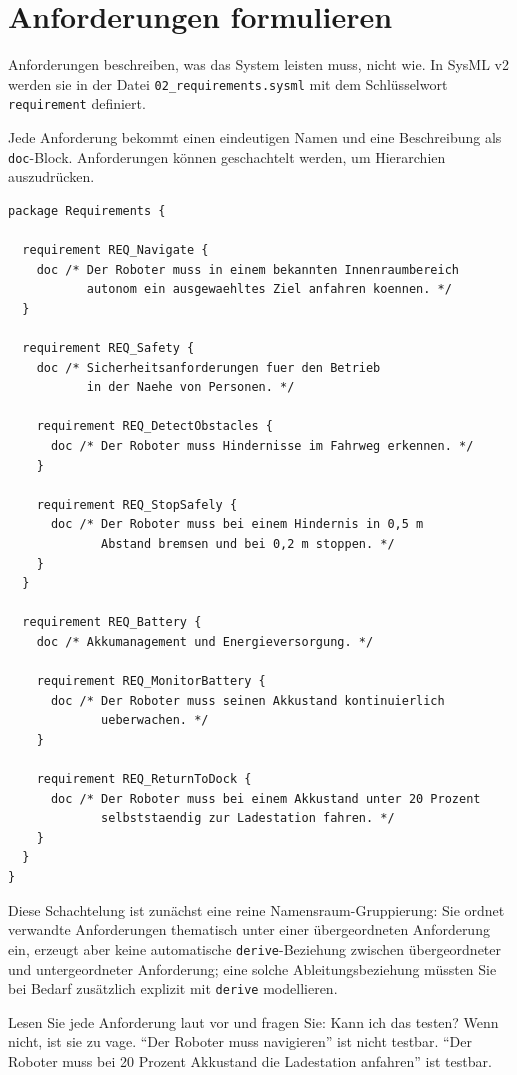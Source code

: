 \section{Anforderungen formulieren}

Anforderungen beschreiben, was das System leisten muss, nicht wie. In SysML v2 werden sie in der Datei \texttt{02\_requirements.sysml} mit dem Schlüsselwort \texttt{requirement} definiert.

Jede Anforderung bekommt einen eindeutigen Namen und eine Beschreibung als \texttt{doc}-Block. Anforderungen können geschachtelt werden, um Hierarchien auszudrücken.

\begin{lstlisting}
package Requirements {

  requirement REQ_Navigate {
    doc /* Der Roboter muss in einem bekannten Innenraumbereich
           autonom ein ausgewaehltes Ziel anfahren koennen. */
  }

  requirement REQ_Safety {
    doc /* Sicherheitsanforderungen fuer den Betrieb
           in der Naehe von Personen. */

    requirement REQ_DetectObstacles {
      doc /* Der Roboter muss Hindernisse im Fahrweg erkennen. */
    }

    requirement REQ_StopSafely {
      doc /* Der Roboter muss bei einem Hindernis in 0,5 m
             Abstand bremsen und bei 0,2 m stoppen. */
    }
  }

  requirement REQ_Battery {
    doc /* Akkumanagement und Energieversorgung. */

    requirement REQ_MonitorBattery {
      doc /* Der Roboter muss seinen Akkustand kontinuierlich
             ueberwachen. */
    }

    requirement REQ_ReturnToDock {
      doc /* Der Roboter muss bei einem Akkustand unter 20 Prozent
             selbststaendig zur Ladestation fahren. */
    }
  }
}
\end{lstlisting}

Diese Schachtelung ist zunächst eine reine Namensraum-Gruppierung: Sie ordnet verwandte Anforderungen thematisch unter einer übergeordneten Anforderung ein, erzeugt aber keine automatische \texttt{derive}-Beziehung zwischen übergeordneter und untergeordneter Anforderung; eine solche Ableitungsbeziehung müssten Sie bei Bedarf zusätzlich explizit mit \texttt{derive} modellieren.

Lesen Sie jede Anforderung laut vor und fragen Sie: Kann ich das testen? Wenn nicht, ist sie zu vage. \enquote{Der Roboter muss navigieren} ist nicht testbar. \enquote{Der Roboter muss bei 20 Prozent Akkustand die Ladestation anfahren} ist testbar.

